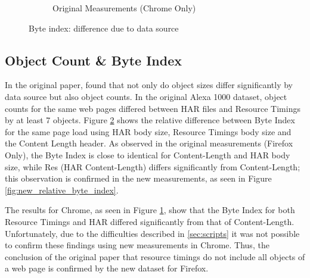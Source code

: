 \begin{figure}
\begin{subfigure}{\linewidth}
	\caption{Original Measurements (Chrome Only)}
	\label{fig:orig_chrome_relative_byte_index}
\end{subfigure}
\caption{Byte index: difference due to data source}
\label{fig:relative_byte_index}
\end{figure}

\subsection{Object Count \& Byte Index}
In the original paper, \citeauthor{10.1007/978-3-030-15986-3_19} found that not only do object sizes differ significantly by data source but also object counts. In the original Alexa 1000 dataset, object counts for the same web pages differed between HAR files and Resource Timings by at least 7 objects. Figure \ref{fig:relative_byte_index} shows the relative difference between Byte Index for the same page load using HAR body size, Resource Timings body size and the Content Length header. As observed in the original measurements (Firefox Only), the Byte Index is close to identical for Content-Length and HAR body size, while Res (HAR Content-Length) differs significantly from Content-Length; this observation is confirmed in the new measurements, as seen in Figure \ref{fig:new_relative_byte_index}. 

The results for Chrome, as seen in Figure \ref{fig:orig_chrome_relative_byte_index}, show that the Byte Index for both Resource Timings and HAR differed significantly from that of Content-Length. Unfortunately, due to the difficulties described in \ref{sec:scripts} it was not possible to confirm these findings using new measurements in Chrome. Thus, the conclusion of the original paper that resource timings do not include all objects of a web page is confirmed by the new dataset for Firefox.
